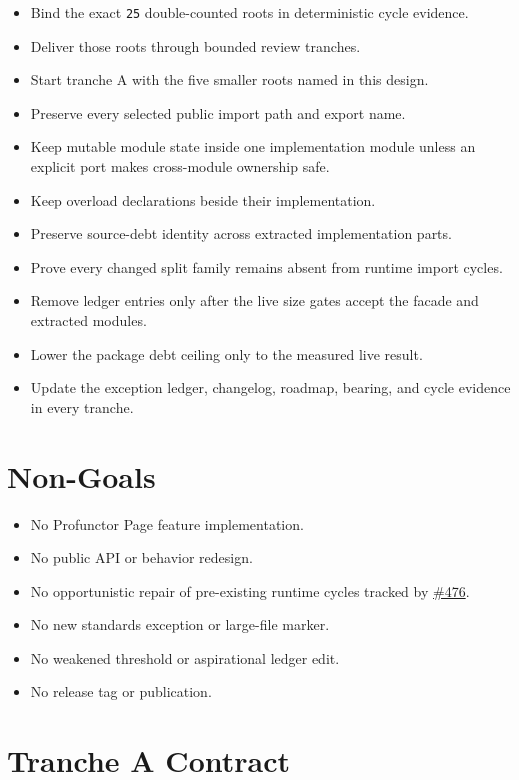 \begin{itemize}
\tightlist
\item
  Bind the exact \texttt{2\allowbreak{}5} double-counted roots in deterministic cycle evidence.
\item
  Deliver those roots through bounded review tranches.
\item
  Start tranche A with the five smaller roots named in this design.
\item
  Preserve every selected public import path and export name.
\item
  Keep mutable module state inside one implementation module unless an explicit port makes cross-module ownership safe.
\item
  Keep overload declarations beside their implementation.
\item
  Preserve source-debt identity across extracted implementation parts.
\item
  Prove every changed split family remains absent from runtime import cycles.
\item
  Remove ledger entries only after the live size gates accept the facade and extracted modules.
\item
  Lower the package debt ceiling only to the measured live result.
\item
  Update the exception ledger, changelog, roadmap, bearing, and cycle evidence in every tranche.
\end{itemize}

\section{Non-Goals}\label{record-247-non-goals}

\begin{itemize}
\tightlist
\item
  No Profunctor Page feature implementation.
\item
  No public API or behavior redesign.
\item
  No opportunistic repair of pre-existing runtime cycles tracked by \href{https://github.com/flyingrobots/bijou/issues/476}{\#476}.
\item
  No new standards exception or large-file marker.
\item
  No weakened threshold or aspirational ledger edit.
\item
  No release tag or publication.
\end{itemize}

\section{Tranche A Contract}\label{record-247-tranche-a-contract}

